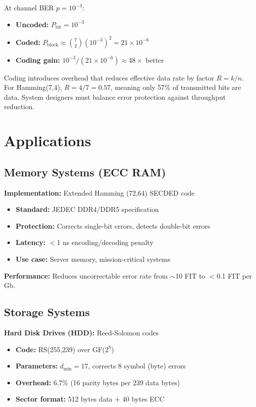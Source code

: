 At channel BER $p = 10^{-3}$:
\begin{itemize}
\item \textbf{Uncoded:} $P_{\text{bit}} = 10^{-3}$
\item \textbf{Coded:} $P_{\text{block}} \approx \binom{7}{2} (10^{-3})^2 = 21 \times 10^{-6}$
\item \textbf{Coding gain:} $10^{-3} / (21 \times 10^{-6}) \approx 48\times$ better
\end{itemize}

\begin{warningbox}
Coding introduces overhead that reduces effective data rate by factor $R = k/n$. For Hamming(7,4), $R = 4/7 = 0.57$, meaning only 57\% of transmitted bits are data. System designers must balance error protection against throughput reduction.
\end{warningbox}

\section{Applications}

\subsection{Memory Systems (ECC RAM)}

\textbf{Implementation:} Extended Hamming (72,64) SECDED code
\begin{itemize}
\item \textbf{Standard:} JEDEC DDR4/DDR5 specification
\item \textbf{Protection:} Corrects single-bit errors, detects double-bit errors
\item \textbf{Latency:} $<$1 ns encoding/decoding penalty
\item \textbf{Use case:} Server memory, mission-critical systems
\end{itemize}

\textbf{Performance:} Reduces uncorrectable error rate from $\sim$10 FIT to $<$0.1 FIT per Gb.

\subsection{Storage Systems}

\textbf{Hard Disk Drives (HDD):} Reed-Solomon codes
\begin{itemize}
\item \textbf{Code:} RS(255,239) over GF($2^8$)
\item \textbf{Parameters:} $d_{\min} = 17$, corrects 8 symbol (byte) errors
\item \textbf{Overhead:} 6.7\% (16 parity bytes per 239 data bytes)
\item \textbf{Sector format:} 512 bytes data + 40 bytes ECC
\end{itemize}

